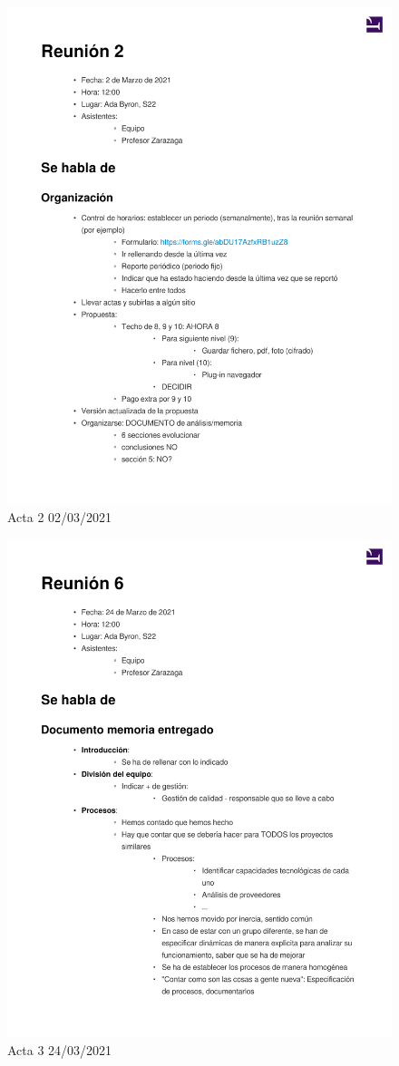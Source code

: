 \documentclass{article}
\begin{document}
\begin{figure}[H]
   \includegraphics[width=.8\textwidth]{../../actas_reuniones/2021.03.02_2_Actas.pdf}
   \caption{Acta 2 02/03/2021}
\end{figure}
\begin{figure}[H]
   \includegraphics[width=.8\textwidth]{../../actas_reuniones/2021.03.24_3_Actas.pdf}
   \caption{Acta 3 24/03/2021}
\end{figure}
\end{document}
